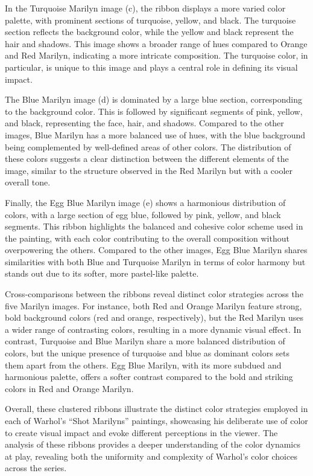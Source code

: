 \documentclass{article}
\begin{document}
In the Turquoise Marilyn image (c), the ribbon displays a more varied
color palette, with prominent sections of turquoise, yellow, and black.
The turquoise section reflects the background color, while the yellow
and black represent the hair and shadows. This image shows a broader
range of hues compared to Orange and Red Marilyn, indicating a more
intricate composition. The turquoise color, in particular, is unique to
this image and plays a central role in defining its visual impact.

The Blue Marilyn image (d) is dominated by a large blue section,
corresponding to the background color. This is followed by significant
segments of pink, yellow, and black, representing the face, hair, and
shadows. Compared to the other images, Blue Marilyn has a more balanced
use of hues, with the blue background being complemented by well-defined
areas of other colors. The distribution of these colors suggests a clear
distinction between the different elements of the image, similar to the
structure observed in the Red Marilyn but with a cooler overall tone.

Finally, the Egg Blue Marilyn image (e) shows a harmonious distribution
of colors, with a large section of egg blue, followed by pink, yellow,
and black segments. This ribbon highlights the balanced and cohesive
color scheme used in the painting, with each color contributing to the
overall composition without overpowering the others. Compared to the
other images, Egg Blue Marilyn shares similarities with both Blue and
Turquoise Marilyn in terms of color harmony but stands out due to its
softer, more pastel-like palette.

Cross-comparisons between the ribbons reveal distinct color strategies
across the five Marilyn images. For instance, both Red and Orange
Marilyn feature strong, bold background colors (red and orange,
respectively), but the Red Marilyn uses a wider range of contrasting
colors, resulting in a more dynamic visual effect. In contrast,
Turquoise and Blue Marilyn share a more balanced distribution of colors,
but the unique presence of turquoise and blue as dominant colors sets
them apart from the others. Egg Blue Marilyn, with its more subdued and
harmonious palette, offers a softer contrast compared to the bold and
striking colors in Red and Orange Marilyn.

Overall, these clustered ribbons illustrate the distinct color
strategies employed in each of Warhol's ``Shot Marilyns'' paintings,
showcasing his deliberate use of color to create visual impact and evoke
different perceptions in the viewer. The analysis of these ribbons
provides a deeper understanding of the color dynamics at play, revealing
both the uniformity and complexity of Warhol's color choices across the
series.
\end{document}
